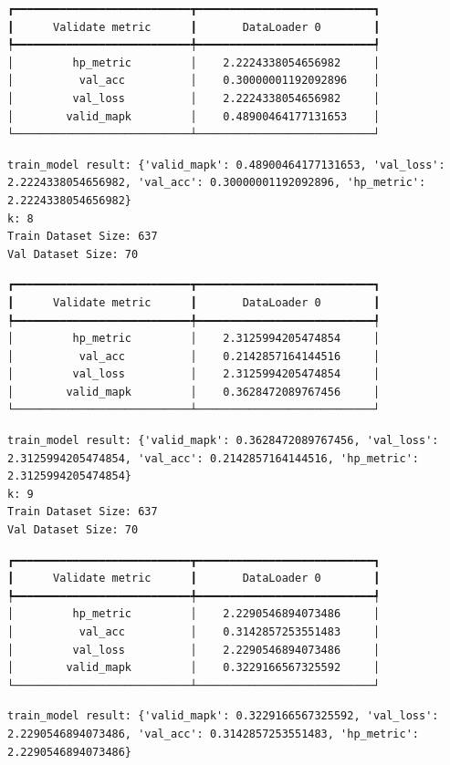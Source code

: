 \documentclass[
  letterpaper,
  DIV=11,
  numbers=noendperiod]{scrreprt}
\begin{document}
\begin{verbatim}
┏━━━━━━━━━━━━━━━━━━━━━━━━━━━┳━━━━━━━━━━━━━━━━━━━━━━━━━━━┓
┃      Validate metric      ┃       DataLoader 0        ┃
┡━━━━━━━━━━━━━━━━━━━━━━━━━━━╇━━━━━━━━━━━━━━━━━━━━━━━━━━━┩
│         hp_metric         │    2.2224338054656982     │
│          val_acc          │    0.30000001192092896    │
│         val_loss          │    2.2224338054656982     │
│        valid_mapk         │    0.48900464177131653    │
└───────────────────────────┴───────────────────────────┘
\end{verbatim}

\begin{verbatim}
train_model result: {'valid_mapk': 0.48900464177131653, 'val_loss': 2.2224338054656982, 'val_acc': 0.30000001192092896, 'hp_metric': 2.2224338054656982}
k: 8
Train Dataset Size: 637
Val Dataset Size: 70
\end{verbatim}

\begin{verbatim}
┏━━━━━━━━━━━━━━━━━━━━━━━━━━━┳━━━━━━━━━━━━━━━━━━━━━━━━━━━┓
┃      Validate metric      ┃       DataLoader 0        ┃
┡━━━━━━━━━━━━━━━━━━━━━━━━━━━╇━━━━━━━━━━━━━━━━━━━━━━━━━━━┩
│         hp_metric         │    2.3125994205474854     │
│          val_acc          │    0.2142857164144516     │
│         val_loss          │    2.3125994205474854     │
│        valid_mapk         │    0.3628472089767456     │
└───────────────────────────┴───────────────────────────┘
\end{verbatim}

\begin{verbatim}
train_model result: {'valid_mapk': 0.3628472089767456, 'val_loss': 2.3125994205474854, 'val_acc': 0.2142857164144516, 'hp_metric': 2.3125994205474854}
k: 9
Train Dataset Size: 637
Val Dataset Size: 70
\end{verbatim}

\begin{verbatim}
┏━━━━━━━━━━━━━━━━━━━━━━━━━━━┳━━━━━━━━━━━━━━━━━━━━━━━━━━━┓
┃      Validate metric      ┃       DataLoader 0        ┃
┡━━━━━━━━━━━━━━━━━━━━━━━━━━━╇━━━━━━━━━━━━━━━━━━━━━━━━━━━┩
│         hp_metric         │    2.2290546894073486     │
│          val_acc          │    0.3142857253551483     │
│         val_loss          │    2.2290546894073486     │
│        valid_mapk         │    0.3229166567325592     │
└───────────────────────────┴───────────────────────────┘
\end{verbatim}

\begin{verbatim}
train_model result: {'valid_mapk': 0.3229166567325592, 'val_loss': 2.2290546894073486, 'val_acc': 0.3142857253551483, 'hp_metric': 2.2290546894073486}
\end{verbatim}
\end{document}

